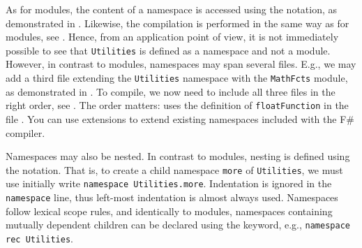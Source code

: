 \documentclass[springer.tex]{subfiles}
\begin{document}
As for modules, the content of a namespace is accessed using the  notation, as demonstrated in .
%
%
Likewise, the compilation is performed in the same way as for modules, see .
%
%
Hence, from an application point of view, it is not immediately possible to see that \lstinline{Utilities} is defined as a namespace and not a module.  However, in contrast to modules, namespaces may span several files. E.g., we may add a third file extending the \lstinline{Utilities} namespace with the \lstinline{MathFcts} module, as demonstrated in .
%
%
To compile, we now need to include all three files in the right order, see .
%
%
The order matters: uses the definition of \lstinline{floatFunction} in the file . You can use extensions to extend existing namespaces included with the F\# compiler.

Namespaces may also be nested. In contrast to modules, nesting is defined using the  notation. That is, to create a child namespace \lstinline{more} of \lstinline{Utilities}, we must use initially write \mbox{\lstinline{namespace Utilities.more}}. Indentation is ignored in the \lstinline{namespace} line, thus left-most indentation is almost always used. Namespaces follow lexical scope rules, and identically to modules, namespaces containing mutually dependent children can be declared using the  keyword, e.g., \mbox{\lstinline{namespace rec Utilities}}.
\end{document}
